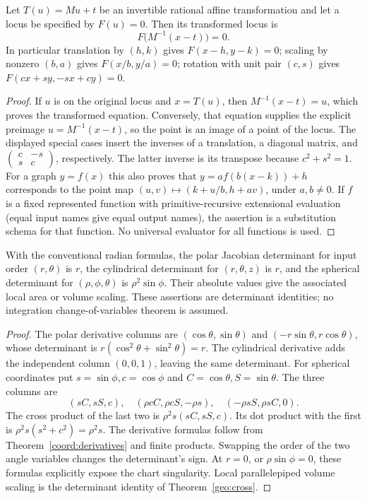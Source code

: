 \begin{theorem}
\label{coord:locus-transform}
Let $T(u)=Mu+t$ be an invertible rational affine transformation and let
a locus be specified by $F(u)=0$. Then its transformed locus is
\[
 F\bigl(M^{-1}(x-t)\bigr)=0.
\]
In particular translation by $(h,k)$ gives $F(x-h,y-k)=0$;
scaling by nonzero $(b,a)$ gives $F(x/b,y/a)=0$; rotation with
unit pair $(c,s)$ gives $F(cx+sy,-sx+cy)=0$.
\end{theorem}
\begin{proof}
If $u$ is on the original locus and $x=T(u)$, then
$M^{-1}(x-t)=u$, which proves the transformed equation. Conversely,
that equation supplies the explicit preimage $u=M^{-1}(x-t)$, so
the point is an image of a point of the locus. The displayed special
cases insert the inverses of a translation, a diagonal matrix, and
$\left(\begin{smallmatrix}c&-s\\s&c\end{smallmatrix}\right)$,
respectively. The latter inverse is its transpose because $c^2+s^2=1$.
For a graph $y=f(x)$ this also proves that
$y=a f(b(x-k))+h$ corresponds to the point map
$(u,v)\mapsto(k+u/b,h+av)$, under $a,b\ne0$. If $f$ is a
fixed represented function with primitive-recursive extensional evaluation
(equal input names give equal output names), the assertion is a substitution
schema for that function. No universal evaluator for all functions is used.
\end{proof}

\begin{proposition}
\label{coord:jacobians}
With the conventional radian formulas, the polar Jacobian determinant
for input order $(r,\theta)$ is $r$, the cylindrical determinant for
$(r,\theta,z)$ is $r$, and the spherical determinant for
$(\rho,\phi,\theta)$ is $\rho^2\sin\phi$. Their absolute values
give the associated local area or volume scaling. These assertions
are determinant identities; no integration change-of-variables theorem
is assumed.
\end{proposition}
\begin{proof}
The polar derivative columns are $(\cos\theta,\sin\theta)$ and
$(-r\sin\theta,r\cos\theta)$, whose determinant is
$r(\cos^2\theta+\sin^2\theta)=r$. The cylindrical derivative
adds the independent column $(0,0,1)$, leaving the same determinant.
For spherical coordinates put $s=\sin\phi,c=\cos\phi$ and
$C=\cos\theta,S=\sin\theta$. The three columns are
\[
 (sC,sS,c),\quad(\rho cC,\rho cS,-\rho s),\quad
 (-\rho sS,\rho sC,0).
\]
The cross product of the last two is
$\rho^2s(sC,sS,c)$. Its dot product with the first is
$\rho^2s(s^2+c^2)=\rho^2s$. The derivative formulas follow from
Theorem~\ref{coord:derivatives} and finite products. Swapping the
order of the two angle variables changes the determinant's sign.
At $r=0$, or $\rho\sin\phi=0$, these formulas explicitly expose
the chart singularity. Local parallelepiped volume scaling is the
determinant identity of Theorem~\ref{geo:cross}.
\end{proof}

